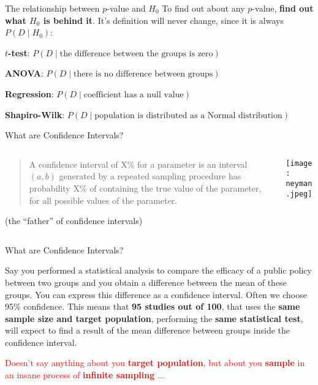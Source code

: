 \begin{frame}{The relationship between $p$-value and $H_0$}
	To find out about any $p$-value, \textbf{find out what $H_0$ is behind it}.
	It's definition will never change, since it is always $P(D \mid H_0)$:
	\begin{vfilleditems}
		\item \textbf{$t$-test}: $P(D \mid \text{the difference between the groups is zero})$
		\item \textbf{ANOVA}: $P(D \mid \text{there is no difference between groups})$
		\item \textbf{Regression}: $P(D \mid \text{coefficient has a null value})$
		\item \textbf{Shapiro-Wilk}: $P(D \mid \text{population is distributed as a Normal distribution})$
	\end{vfilleditems}
\end{frame}

\begin{frame}{What are Confidence Intervals?}
	\begin{columns}
		\begin{column}{0.8\textwidth}
			\begin{defn}
				\begin{quotation}
					A confidence interval of X\% for a parameter is an interval
					$(a, b)$ generated by a repeated sampling procedure
					has probability X\% of containing the true value of the parameter,
					for all possible values of the parameter.
				\end{quotation}
				\vfill \vfill
				\textcite{neyman1937outline} (the ``father'' of confidence intervals)
			\end{defn}
		\end{column}
		\begin{column}{0.2\textwidth}
			\centering
			\texttt{[image: neyman.jpeg]}
		\end{column}
	\end{columns}
\end{frame}

\begin{frame}{What are Confidence Intervals?}
	\begin{example}
		Say you performed a statistical analysis to compare
		the efficacy of a public policy between two groups and you obtain a
		difference between the mean of these groups.
		You can express this difference as a confidence interval.
		Often we choose 95\% confidence.
		This means that \textbf{95 studies out of 100},
		that uses the \textbf{same sample size and target population},
		performing the \textbf{same statistical test},
		will expect to find a result of the mean difference between groups
		inside the confidence interval.
	\end{example}
	\footnotesize \textcolor{red}{Doesn't say anything about you \textbf{target population},
		but about you \textbf{sample} in an insane process of \textbf{infinite sampling} ...}
\end{frame}

